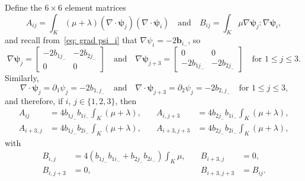\documentclass[a4paper,12pt]{article}
\newcommand{\bs}[1]{\boldsymbol{#1}}
\begin{document}
Define the $6\times6$ element matrices
\[
A_{ij}=\int_K(\mu+\lambda)(\nabla\cdot\bs{\psi}_j)(\nabla\cdot\bs{\psi}_i)
\quad\text{and}\quad
B_{ij}=\int_K\mu\nabla\bs{\psi}_j:\nabla\bs{\psi}_i,
\]
and recall from~\eqref{eq: grad psi_i} that $\nabla\psi_i=-2\bs{b}_{i_-}$, so
\[
\nabla\bs{\psi}_j=\begin{bmatrix}
-2b_{1j_-}&-2b_{2j_-}\\ 0&0\end{bmatrix}
\quad\text{and}\quad
\nabla\bs{\psi}_{j+3}=\begin{bmatrix}
0&0\\ -2b_{1j_-}&-2b_{2j_-}\end{bmatrix}
\quad\text{for $1\le j\le3$.}
\]
Similarly,
\[
\nabla\cdot\bs{\psi}_j=\partial_1\psi_j=-2b_{1,j_-}
\quad\text{and}\quad
\nabla\cdot\bs{\psi}_{j+3}=\partial_2\psi_j=-2b_{2,j_-}
\quad\text{for $1\le j\le3$,}
\]
and therefore, if $i$, $j\in\{1,2,3\}$, then
\[
\begin{aligned}
A_{ij}&=4b_{1j_-}b_{1i_-}\int_K(\mu+\lambda),&\quad
A_{i,j+3}&=4b_{2j_-}b_{1i_-}\int_K(\mu+\lambda),\\
A_{i+3,j}&=4b_{1j_-}b_{2i_-}\int_K(\mu+\lambda),&\quad
A_{i+3,j+3}&=4b_{2j_-}b_{2i_-}\int_K(\mu+\lambda), 
\end{aligned}
\]
with
\[
\begin{aligned}
B_{i,j}&=4(b_{1j_-}b_{1i_-}+b_{2j_-}b_{2i_-})\int_K\mu,&\quad
B_{i+3,j}&=0,\\
B_{i,j+3}&=0,&\quad
B_{i+3,j+3}&=B_{ij}.
\end{aligned}
\]
\end{document}
